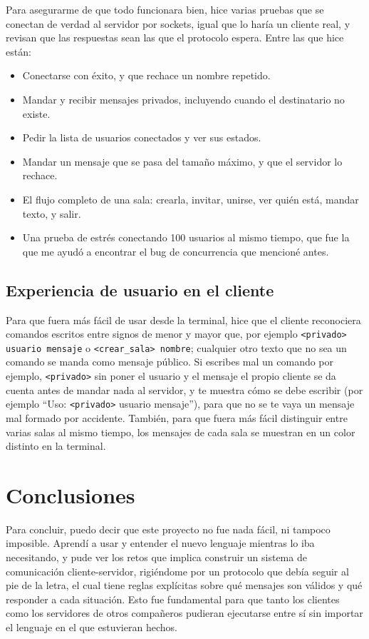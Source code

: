 \documentclass[12pt,letterpaper]{article}
\begin{document}
Para asegurarme de que todo funcionara bien, hice varias pruebas que se
conectan de verdad al servidor por sockets, igual que lo haría un
cliente real, y revisan que las respuestas sean las que el protocolo
espera. Entre las que hice están:

\begin{itemize}
    \item Conectarse con éxito, y que rechace un nombre repetido.
    \item Mandar y recibir mensajes privados, incluyendo cuando el
          destinatario no existe.
    \item Pedir la lista de usuarios conectados y ver sus estados.
    \item Mandar un mensaje que se pasa del tamaño máximo, y que el
          servidor lo rechace.
    \item El flujo completo de una sala: crearla, invitar, unirse, ver
          quién está, mandar texto, y salir.
    \item Una prueba de estrés conectando 100 usuarios al mismo tiempo,
          que fue la que me ayudó a encontrar el bug de concurrencia
          que mencioné antes.
\end{itemize}

\subsection{Experiencia de usuario en el cliente}

Para que fuera más fácil de usar desde la terminal, hice que el cliente
reconociera comandos escritos entre signos de menor y mayor que, por
ejemplo \texttt{<privado> usuario mensaje} o
\texttt{<crear\_sala> nombre}; cualquier otro texto que no sea un
comando se manda como mensaje público. Si escribes mal un comando
por ejemplo, \texttt{<privado>} sin poner el usuario y el mensaje el
propio cliente se da cuenta antes de mandar nada al servidor, y te
muestra cómo se debe escribir (por ejemplo ``Uso: \texttt{<privado>} usuario mensaje''), para que no se te vaya un mensaje mal formado por
accidente. También, para que fuera más fácil distinguir entre varias
salas al mismo tiempo, los mensajes de cada sala se muestran en un
color distinto en la terminal.

\section{Conclusiones}

Para concluir, puedo decir que este proyecto no fue nada fácil, ni
tampoco imposible. Aprendí a usar y entender el nuevo lenguaje mientras
lo iba necesitando, y pude ver los retos que implica construir un
sistema de comunicación cliente-servidor, rigiéndome por un protocolo
que debía seguir al pie de la letra, el cual tiene reglas explícitas
sobre qué mensajes son válidos y qué responder a cada situación. Esto
fue fundamental para que tanto los clientes como los servidores de
otros compañeros pudieran ejecutarse entre sí sin importar el lenguaje
en el que estuvieran hechos.
\end{document}
